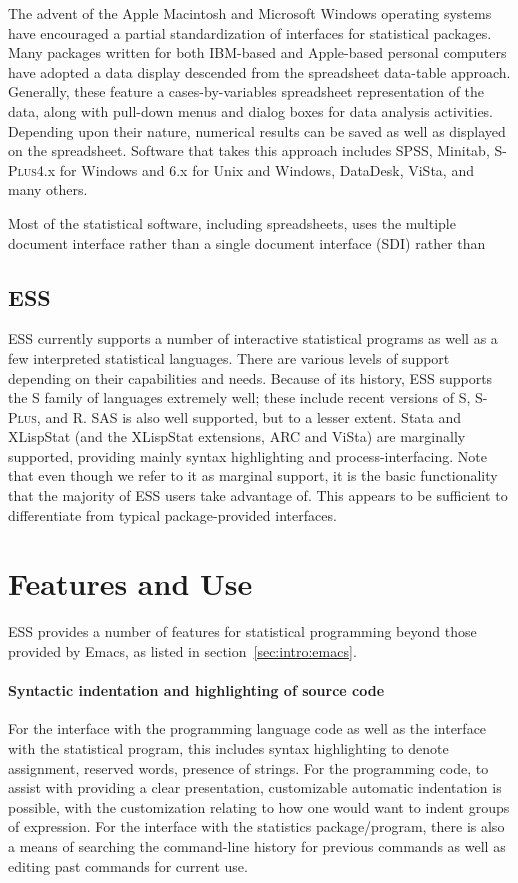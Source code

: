 \documentclass{article}
\newcommand*{\Splus}{\textsc{S-Plus}}
\begin{document}
The advent of the Apple Macintosh and Microsoft Windows operating
systems have encouraged a partial standardization of interfaces for
statistical packages.  Many packages written for both IBM-based and
Apple-based personal computers have adopted a data display descended
from the spreadsheet data-table approach.  Generally, these feature a
cases-by-variables spreadsheet representation of the data, along with
pull-down menus and dialog boxes for data analysis activities.
Depending upon their nature, numerical results can be saved as well as
displayed on the spreadsheet.  Software that takes this approach
includes SPSS, Minitab, \Splus 4.x for Windows and 6.x for Unix and
Windows, DataDesk, ViSta, and many others.

Most of the statistical software, including spreadsheets, uses the
multiple document interface rather than a single document interface (SDI)
rather than

\subsection{ESS}
\label{sec:UI:ESS}

ESS currently supports a number of interactive statistical programs as
well as a few interpreted statistical languages. There are various
levels of support depending on their capabilities and needs.  Because of
its history, ESS supports the S family of languages extremely well;
these include recent versions of S, \Splus, and R.  SAS is also well
supported, but to a lesser extent.  Stata and XLispStat (and the
XLispStat extensions, ARC and ViSta) are marginally supported, providing
mainly syntax highlighting and process-interfacing.  Note that even
though we refer to it as marginal support, it is the basic functionality
that the majority of ESS users take advantage of.  This appears to be
sufficient to differentiate from typical package-provided interfaces.

\section{Features and Use}
\label{sec:basic}

ESS provides a number of features for statistical programming beyond
those provided by Emacs, as listed in section~\ref{sec:intro:emacs}.

\paragraph{Syntactic indentation and highlighting of source code}
For the interface with the programming language code as well as the
interface with the statistical program, this includes syntax
highlighting to denote assignment, reserved words, presence of
strings.  For the programming code, to assist with providing a clear
presentation, customizable automatic indentation is possible, with the
customization relating to how one would want to indent groups of
expression.  For the interface with the statistics package/program,
there is also a means of searching the command-line history for
previous commands as well as editing past commands for current use.
\end{document}
